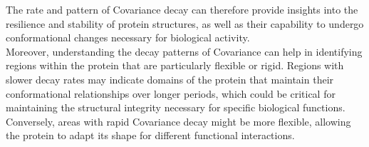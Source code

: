 \documentclass[English, Lau, oneside]{sapthesis}
\begin{document}
The rate and pattern of Covariance decay can therefore provide insights into the resilience and stability of protein structures, as well as their capability to undergo conformational changes necessary for biological activity.\\
Moreover, understanding the decay patterns of Covariance can help in identifying regions within the protein that are particularly flexible or rigid. 
Regions with slower decay rates may indicate domains of the protein that maintain their conformational relationships over longer periods, which could be critical for maintaining the structural integrity necessary for specific biological functions. Conversely, areas with rapid Covariance decay might be more flexible, allowing the protein to adapt its shape for different functional interactions.\\
\end{document}
